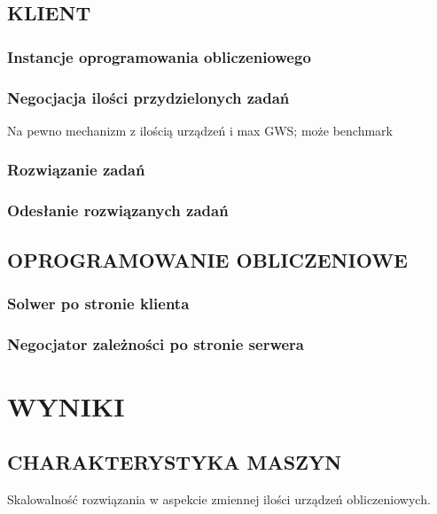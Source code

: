 \documentclass[12pt,a4paper,twoside]{article}
\begin{document}
\subsection{KLIENT}

\subsubsection{Instancje oprogramowania obliczeniowego}

\subsubsection{Negocjacja ilości przydzielonych zadań}

Na pewno mechanizm z ilością urządzeń i max GWS; może benchmark

\subsubsection{Rozwiązanie zadań}

\subsubsection{Odesłanie rozwiązanych zadań}


\subsection{OPROGRAMOWANIE OBLICZENIOWE}

\subsubsection{Solwer po stronie klienta}

\subsubsection{Negocjator zależności po stronie serwera}


\section{WYNIKI}

\subsection{CHARAKTERYSTYKA MASZYN}

Skalowalność rozwiązania w aspekcie zmiennej ilości urządzeń obliczeniowych.
\end{document}

